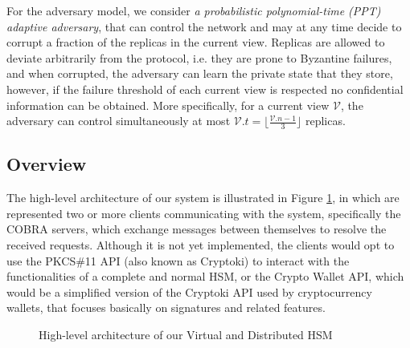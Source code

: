 \documentclass[runningheads]{llncs}
\begin{document}
For the adversary model, we consider \textit{a probabilistic polynomial-time (PPT) adaptive adversary}, that can control the network and may at any time decide to corrupt a fraction of the replicas in the current view. Replicas are allowed to deviate arbitrarily from the protocol, i.e. they are prone to Byzantine failures, and when corrupted, the adversary can learn the private state that they store, however, if the failure threshold of each current view is respected no confidential information can be obtained. More specifically, for a current view $\mathcal{V}$, the adversary can control simultaneously at most $\mathcal{V}.t = \lfloor\frac{\mathcal{V}.n - 1}{3} \rfloor$ replicas.

\subsection{Overview} \label{sec:overview}

The high-level architecture of our system is illustrated in Figure \ref{fig:archdvhsm}, in which are represented two or more clients communicating with the system, specifically the COBRA servers, which exchange messages between themselves to resolve the received requests. Although it is not yet implemented, the clients would opt to use the PKCS\#11 API (also known as Cryptoki) to interact with the functionalities of a complete and normal HSM, or the Crypto Wallet API, which would be a simplified version of the Cryptoki API used by cryptocurrency wallets, that focuses basically on signatures and related features.

\begin{figure}[]
    \begin{center}
    \end{center}
    \caption{High-level architecture of our Virtual and Distributed HSM}
    \label{fig:archdvhsm}
\end{figure}
\end{document}
